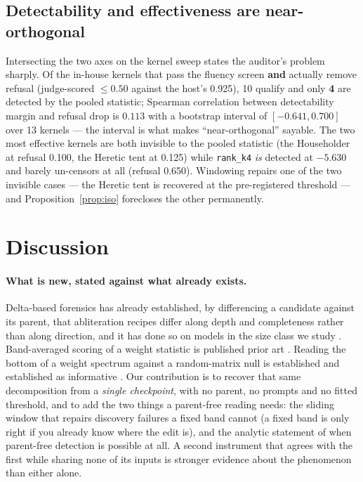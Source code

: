 \documentclass[11pt,letterpaper]{article}
\begin{document}
\subsection{Detectability and effectiveness are near-orthogonal}

Intersecting the two axes on the kernel sweep states the auditor's problem sharply. Of the in-house kernels that pass the fluency screen \textbf{and} actually remove refusal (judge-scored $\leq 0.50$ against the host's 0.925), 10 qualify and only \textbf{4} are detected by the pooled statistic; Spearman correlation between detectability margin and refusal drop is $0.113$ with a bootstrap interval of $[-0.641, 0.700]$ over 13 kernels --- the interval is what makes ``near-orthogonal'' sayable. The two most effective kernels are both invisible to the pooled statistic (the Householder at refusal 0.100, the Heretic tent at 0.125) while \texttt{rank\_k4} \emph{is} detected at $-5.630$ and barely un-censors at all (refusal 0.650). Windowing repairs one of the two invisible cases --- the Heretic tent is recovered at the pre-registered threshold --- and Proposition~\ref{prop:iso} forecloses the other permanently.

\section{Discussion}

\paragraph{What is new, stated against what already exists.} Delta-based forensics has already established, by differencing a candidate against its parent, that abliteration recipes differ along depth and completeness rather than along direction, and it has done so on models in the size class we study \citep{Sapwell2026}. Band-averaged scoring of a weight statistic is published prior art \citep{Hurtado2026, Zhong2025}. Reading the bottom of a weight spectrum against a random-matrix null is established and established as informative \citep{Staats2024}. Our contribution is to recover that same decomposition from a \emph{single checkpoint}, with no parent, no prompts and no fitted threshold, and to add the two things a parent-free reading needs: the sliding window that repairs discovery failures a fixed band cannot (a fixed band is only right if you already know where the edit is), and the analytic statement of when parent-free detection is possible at all. A second instrument that agrees with the first while sharing none of its inputs is stronger evidence about the phenomenon than either alone.
\end{document}
